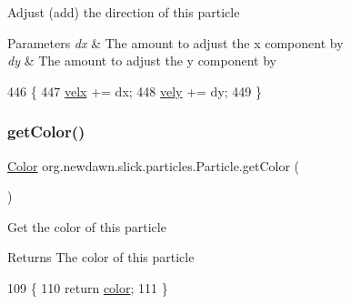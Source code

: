 Adjust (add) the direction of this particle


\begin{DoxyParams}{Parameters}
{\em dx} & The amount to adjust the x component by \\
\hline
{\em dy} & The amount to adjust the y component by \\
\hline
\end{DoxyParams}

\begin{DoxyCode}
446                                                    \{
447         \mbox{\hyperlink{classorg_1_1newdawn_1_1slick_1_1particles_1_1_particle_a9056abd13cffd1064051f9a34a3e70ef}{velx}} += dx;
448         \mbox{\hyperlink{classorg_1_1newdawn_1_1slick_1_1particles_1_1_particle_a799a64a459185f49bcf1e71a53e59014}{vely}} += dy;
449     \}
\end{DoxyCode}
\mbox{\label{classorg_1_1newdawn_1_1slick_1_1particles_1_1_particle_ac25b53b99465bc6e52de1dc5a24121c4}} 
\subsubsection{\texorpdfstring{get\+Color()}{getColor()}}
{\footnotesize\ttfamily \mbox{\hyperlink{classorg_1_1newdawn_1_1slick_1_1_color}{Color}} org.\+newdawn.\+slick.\+particles.\+Particle.\+get\+Color (\begin{DoxyParamCaption}{ }\end{DoxyParamCaption})\hspace{0.3cm}{\ttfamily [inline]}}

Get the color of this particle

\begin{DoxyReturn}{Returns}
The color of this particle 
\end{DoxyReturn}

\begin{DoxyCode}
109                             \{
110         \textcolor{keywordflow}{return} \mbox{\hyperlink{classorg_1_1newdawn_1_1slick_1_1particles_1_1_particle_a2467718786828ecca08ea7f4bfd1c47d}{color}};
111     \}
\end{DoxyCode}
\mbox{\label{classorg_1_1newdawn_1_1slick_1_1particles_1_1_particle_a88890a6068c4d88838f566b29c321d21}} 
